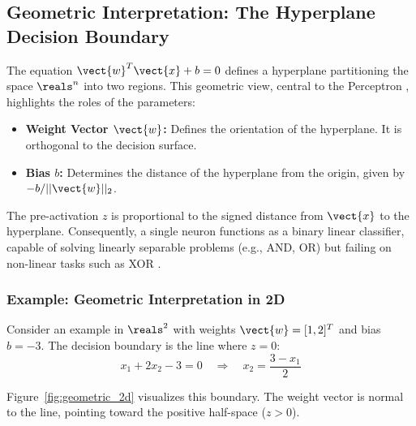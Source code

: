 \subsection{Geometric Interpretation: The Hyperplane Decision Boundary}
The equation $\vect{w}^T \vect{x} + b = 0$ defines a hyperplane partitioning the space $\reals^n$ into two regions. This geometric view, central to the Perceptron \cite{Rosenblatt1958}, highlights the roles of the parameters:
\begin{itemize}
\item \textbf{Weight Vector $\vect{w}$:} Defines the orientation of the hyperplane. It is orthogonal to the decision surface.
\item \textbf{Bias $b$:} Determines the distance of the hyperplane from the origin, given by $-b/||\vect{w}||_2$.
\end{itemize}

The pre-activation $z$ is proportional to the signed distance from $\vect{x}$ to the hyperplane. Consequently, a single neuron functions as a binary linear classifier, capable of solving linearly separable problems (e.g., AND, OR) but failing on non-linear tasks such as XOR \cite{Minsky1969}.

\subsubsection{Example: Geometric Interpretation in 2D}
Consider an example in $\reals^2$ with weights $\vect{w} = [1, 2]^T$ and bias $b = -3$. The decision boundary is the line where $z=0$:
\begin{equation}
x_1 + 2x_2 - 3 = 0 \quad \Rightarrow \quad x_2 = \frac{3 - x_1}{2}
\end{equation}

Figure~\ref{fig:geometric_2d} visualizes this boundary. The weight vector is normal to the line, pointing toward the positive half-space ($z > 0$).

